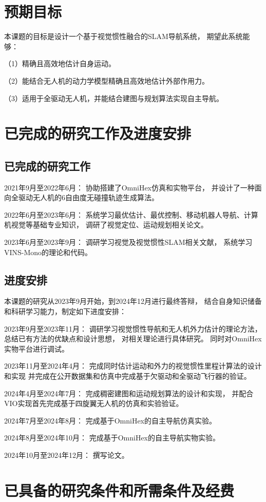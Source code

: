 \section{预期目标}
本课题的目标是设计一个基于视觉惯性融合的SLAM导航系统，
期望此系统能够：

（1）精确且高效地估计自身运动。

（2）能结合无人机的动力学模型精确且高效地估计外部作用力。
 
（3）适用于全驱动无人机，并能结合建图与规划算法实现自主导航。

\section{已完成的研究工作及进度安排}
\subsection{已完成的研究工作}
2021年9月至2022年6月：
协助搭建了OmniHex仿真和实物平台，
并设计了一种面向全驱动无人机的6自由度无碰撞轨迹生成算法。

2022年6月至2023年6月：
系统学习最优估计、最优控制、移动机器人导航、计算机视觉等基础专业知识，
调研了视觉定位、运动规划相关论文。

2023年6月至2023年9月：
调研学习视觉及视觉惯性SLAM相关文献，
系统学习VINS-Mono的理论和代码。

\subsection{进度安排}
本课题的研究从2023年9月开始，到2024年12月进行最终答辩，
结合自身知识储备和科研学习能力，制定如下进度安排：

2023年9月至2023年11月：
调研学习视觉惯性导航和无人机外力估计的理论方法，
总结已有方法的优缺点和设计思想，
对相关理论进行具体研究。
同时对OmniHex实物平台进行调试。

2023年11月至2024年4月：
完成同时估计运动和外力的视觉惯性里程计算法的设计和实现
并完成在公开数据集和仿真中完成基于欠驱动和全驱动飞行器的验证。

2024年4月至2024年7月：
完成稠密建图和运动规划算法的设计和实现，
并配合VIO实现首先完成基于四旋翼无人机的仿真和实验验证。

2024年7月至2024年8月：
完成基于OmniHex的自主导航仿真实验。

2024年8月至2024年10月：
完成基于OmniHex的自主导航实物实验。

2024年10月至2024年12月：
撰写论文。

\section{已具备的研究条件和所需条件及经费}
